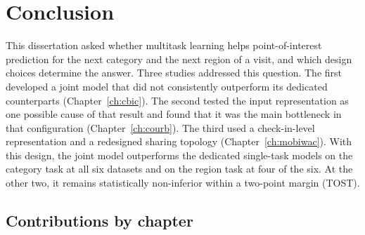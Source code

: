 

\chapter{Conclusion}
\label{ch:conclusion}

This dissertation asked whether multitask learning helps point-of-interest prediction
for the next category and the next region of a visit, and which design choices
determine the answer. Three
studies addressed this question. The first developed a joint model that did not
consistently outperform its dedicated counterparts (Chapter~\ref{ch:cbic}). The second
tested the input representation as one possible cause of that result and found that it
was the main bottleneck in that configuration (Chapter~\ref{ch:courb}). The third used a
check-in-level representation and a redesigned sharing topology
(Chapter~\ref{ch:mobiwac}). With this design, the joint model outperforms the dedicated
single-task models on the category task at all six datasets and on the region task at
four of the six. At the other two, it remains statistically non-inferior within a
two-point margin (TOST).


\section{Contributions by chapter}
\label{sec:conc:contributions}

